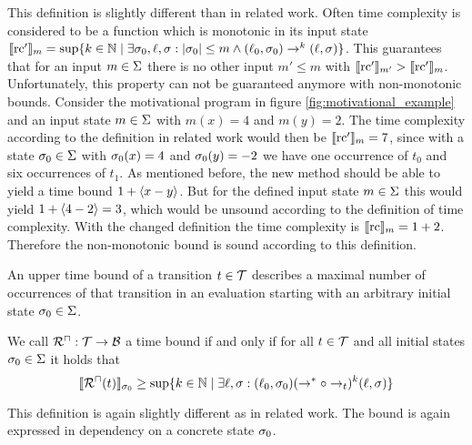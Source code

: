This definition is slightly different than in related work. 
Often time complexity is considered to be a function which is monotonic in its input state $\llbracket \text{rc}' \rrbracket_{m} = \sup \lbrace  k \in \mathbb{N} \mid \exists \sigma_0, \ell, \sigma: \left|\sigma_0\right| \leq m \wedge (\ell_0, \sigma_0) \rightarrow^k (\ell, \sigma)  \rbrace$.
This guarantees that for an input $m \in \Sigma$ there is no other input $m' \leq m$ with $\llbracket \text{rc}' \rrbracket_{m'} > \llbracket \text{rc}' \rrbracket_{m}$.
Unfortunately, this property can not be guaranteed anymore with non-monotonic bounds.
Consider the motivational program in figure \ref{fig:motivational_example} and an input state $m \in \Sigma$ with $m(x) = 4$ and $m(y) = 2$.
The time complexity according to the definition in related work would then be $\llbracket \text{rc}' \rrbracket_{m} = 7$, since with a state $\sigma_0 \in \Sigma$ with $\sigma_0(x) = 4$ and $\sigma_0(y) = -2$ we have one occurrence of $t_0$ and six occurrences of $t_1$.
As mentioned before, the new method should be able to yield a time bound $1 + \langle x-y\rangle$.
But for the defined input state $m \in \Sigma$ this would yield $1 + \langle4-2\rangle = 3$, which would be unsound according to the definition of time complexity.
With the changed definition the time complexity is $\llbracket \text{rc} \rrbracket_{m} = 1 + 2$.
Therefore the non-monotonic bound is sound according to this definition.

An upper time bound of a transition $t \in \mathcal{T}$ describes a maximal number of occurrences of that transition in an evaluation starting with an arbitrary initial state $\sigma_0 \in \Sigma$.

\begin{definition}
  We call ${\mathcal{R}^\sqcap}: \mathcal{T} \rightarrow \mathcal{B}$ a time bound if and only if for all $t \in \mathcal{T}$ and all initial states $\sigma_0 \in \Sigma$ it holds that
  \[ \llbracket {\mathcal{R}^\sqcap}(t) \rrbracket_{\sigma_0} \geq \sup \lbrace  k \in \mathbb{N} \mid \exists \ell, \sigma: (\ell_0, \sigma_0) (\rightarrow^* \circ \rightarrow_t)^k (\ell, \sigma)  \rbrace \]
\end{definition}

This definition is again slightly different as in related work.
The bound is again expressed in dependency on a concrete state $\sigma_0$.

